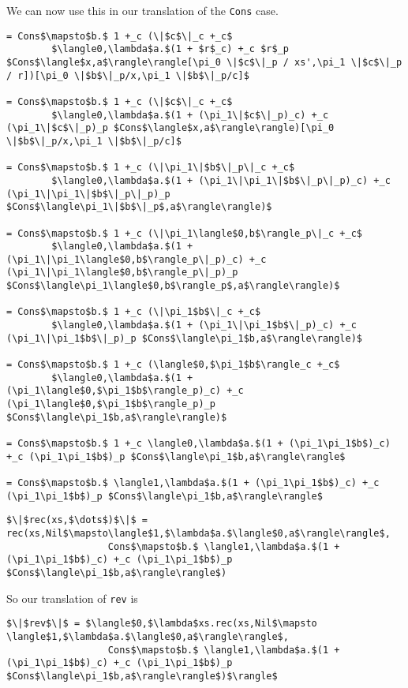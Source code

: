 \documentclass[12pt,letterpaper]{article}
\begin{document}
We can now use this in our translation of the \texttt{Cons} case.
\begin{lstlisting}
= Cons$\mapsto$b.$ 1 +_c (\|$c$\|_c +_c$
        $\langle0,\lambda$a.$(1 + $r$_c) +_c $r$_p $Cons$\langle$x,a$\rangle\rangle[\pi_0 \|$c$\|_p / xs',\pi_1 \|$c$\|_p / r])[\pi_0 \|$b$\|_p/x,\pi_1 \|$b$\|_p/c]$

= Cons$\mapsto$b.$ 1 +_c (\|$c$\|_c +_c$
        $\langle0,\lambda$a.$(1 + (\pi_1\|$c$\|_p)_c) +_c (\pi_1\|$c$\|_p)_p $Cons$\langle$x,a$\rangle\rangle)[\pi_0 \|$b$\|_p/x,\pi_1 \|$b$\|_p/c]$

= Cons$\mapsto$b.$ 1 +_c (\|\pi_1\|$b$\|_p\|_c +_c$
        $\langle0,\lambda$a.$(1 + (\pi_1\|\pi_1\|$b$\|_p\|_p)_c) +_c (\pi_1\|\pi_1\|$b$\|_p\|_p)_p $Cons$\langle\pi_1\|$b$\|_p$,a$\rangle\rangle)$

= Cons$\mapsto$b.$ 1 +_c (\|\pi_1\langle$0,b$\rangle_p\|_c +_c$
        $\langle0,\lambda$a.$(1 + (\pi_1\|\pi_1\langle$0,b$\rangle_p\|_p)_c) +_c (\pi_1\|\pi_1\langle$0,b$\rangle_p\|_p)_p $Cons$\langle\pi_1\langle$0,b$\rangle_p$,a$\rangle\rangle)$

= Cons$\mapsto$b.$ 1 +_c (\|\pi_1$b$\|_c +_c$
        $\langle0,\lambda$a.$(1 + (\pi_1\|\pi_1$b$\|_p)_c) +_c (\pi_1\|\pi_1$b$\|_p)_p $Cons$\langle\pi_1$b,a$\rangle\rangle)$

= Cons$\mapsto$b.$ 1 +_c (\langle$0,$\pi_1$b$\rangle_c +_c$
        $\langle0,\lambda$a.$(1 + (\pi_1\langle$0,$\pi_1$b$\rangle_p)_c) +_c (\pi_1\langle$0,$\pi_1$b$\rangle_p)_p $Cons$\langle\pi_1$b,a$\rangle\rangle)$

= Cons$\mapsto$b.$ 1 +_c \langle0,\lambda$a.$(1 + (\pi_1\pi_1$b$)_c) +_c (\pi_1\pi_1$b$)_p $Cons$\langle\pi_1$b,a$\rangle\rangle$

= Cons$\mapsto$b.$ \langle1,\lambda$a.$(1 + (\pi_1\pi_1$b$)_c) +_c (\pi_1\pi_1$b$)_p $Cons$\langle\pi_1$b,a$\rangle\rangle$
\end{lstlisting}

\begin{lstlisting}
$\|$rec(xs,$\dots$)$\|$ = rec(xs,Nil$\mapsto\langle$1,$\lambda$a.$\langle$0,a$\rangle\rangle$,
                  Cons$\mapsto$b.$ \langle1,\lambda$a.$(1 + (\pi_1\pi_1$b$)_c) +_c (\pi_1\pi_1$b$)_p $Cons$\langle\pi_1$b,a$\rangle\rangle$)
\end{lstlisting}
So our translation of \texttt{rev} is
\begin{lstlisting}
$\|$rev$\|$ = $\langle$0,$\lambda$xs.rec(xs,Nil$\mapsto \langle$1,$\lambda$a.$\langle$0,a$\rangle\rangle$,
                  Cons$\mapsto$b.$ \langle1,\lambda$a.$(1 + (\pi_1\pi_1$b$)_c) +_c (\pi_1\pi_1$b$)_p $Cons$\langle\pi_1$b,a$\rangle\rangle$)$\rangle$
\end{lstlisting}
\end{document}
